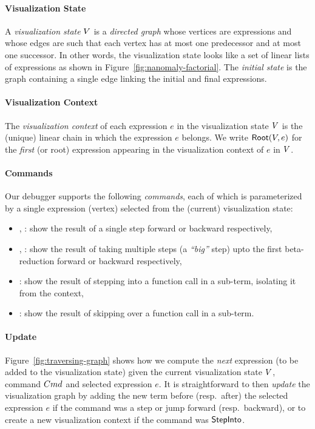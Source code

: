 \paragraph{Visualization State}
%
A \emph{visualization state} $V$ is a \emph{directed graph}
whose vertices are expressions and whose edges are such
that each vertex has at most one predecessor and at most one
successor. In other words, the visualization state looks
like a set of linear lists of expressions as shown in
Figure~\ref{fig:nanomaly-factorial}.
%
The \emph{initial state} is the graph containing a single
edge linking the initial and final expressions.

\paragraph{Visualization Context}
%
The \emph{visualization context} of each expression $e$
in the visualization state $V$ is the (unique) linear chain
in which the expression $e$ belongs.
%
We write $\mathsf{Root}(V, e)$ for the \emph{first} (or root)
expression appearing in the visualization context of $e$ in
$V$.

\paragraph{Commands}
Our debugger supports the following \emph{commands}, each of which
is parameterized by a single expression (vertex) selected from the
(current) visualization state:
%
\begin{itemize}
%
\item \stepforwardsym, \stepbackwardsym:
      show the result of a single step forward or backward respectively,
%
\item \jumpforwardsym, \jumpbackwardsym:
      show the result of taking multiple steps (a \emph{``big''} step)
      upto the first beta-reduction forward or backward respectively,
%
\item \stepintosym:
      show the result of stepping into a function call in a sub-term,
      isolating it from the context,

\item \stepoversym:
      show the result of skipping over a function call in a sub-term.
\end{itemize}



\paragraph{Update}
%
Figure~\ref{fig:traversing-graph} shows
how we compute the \emph{next} expression
(to be added to the visualization state)
given the current visualization state
$V$, command $Cmd$ and selected
expression $e$.
%
It is straightforward to then \emph{update}
the visualization graph by adding the new
term before (resp.\ after) the selected
expression $e$ if the command was a step
or jump forward (resp.\ backward), or
to create a new visualization context
if the command was $\mathsf{StepInto}$.

